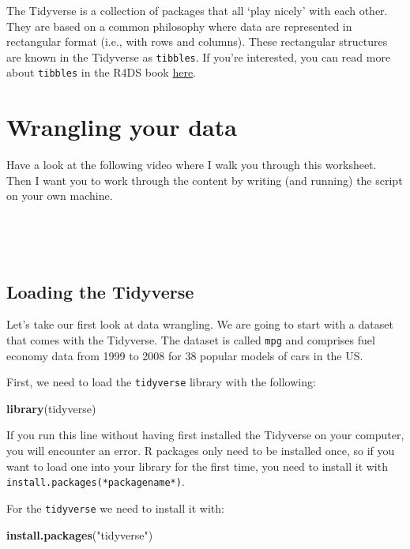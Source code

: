 \documentclass[
]{book}
\newenvironment{Shaded}{\begin{snugshade}}{\end{snugshade}}
\newcommand{\FunctionTok}[1]{\textcolor[rgb]{0.13,0.29,0.53}{\textbf{#1}}}
\newcommand{\NormalTok}[1]{#1}
\newcommand{\StringTok}[1]{\textcolor[rgb]{0.31,0.60,0.02}{#1}}
\begin{document}
The Tidyverse is a collection of packages that all `play nicely' with each other. They are based on a common philosophy where data are represented in rectangular format (i.e., with rows and columns). These rectangular structures are known in the Tidyverse as \texttt{tibbles}. If you're interested, you can read more about \texttt{tibbles} in the R4DS book \href{https://r4ds.had.co.nz/tibbles.html}{here}.

\hypertarget{wrangling-your-data}{%
\section{Wrangling your data}\label{wrangling-your-data}}

Have a look at the following video where I walk you through this worksheet. Then I want you to work through the content by writing (and running) the script on your own machine.

~~

~~

\hypertarget{loading-the-tidyverse}{%
\subsection{Loading the Tidyverse}\label{loading-the-tidyverse}}

Let's take our first look at data wrangling. We are going to start with a dataset that comes with the Tidyverse. The dataset is called \texttt{mpg} and comprises fuel economy data from 1999 to 2008 for 38 popular models of cars in the US.

First, we need to load the \texttt{tidyverse} library with the following:

\begin{Shaded}
\begin{Highlighting}[]
\FunctionTok{library}\NormalTok{(tidyverse)}
\end{Highlighting}
\end{Shaded}

If you run this line without having first installed the Tidyverse on your computer, you will encounter an error. R packages only need to be installed once, so if you want to load one into your library for the first time, you need to install it with \texttt{install.packages(*packagename*)}.

For the \texttt{tidyverse} we need to install it with:

\begin{Shaded}
\begin{Highlighting}[]
\FunctionTok{install.packages}\NormalTok{(}\StringTok{"tidyverse"}\NormalTok{)}
\end{Highlighting}
\end{Shaded}
\end{document}
